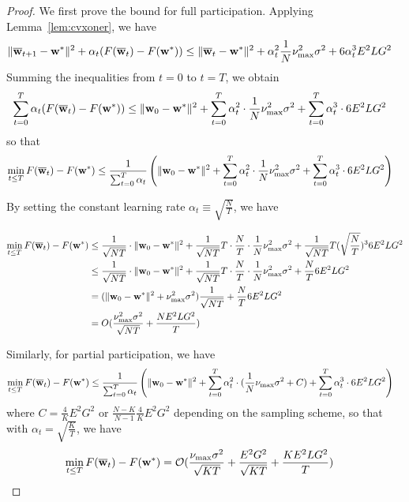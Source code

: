 \begin{proof}
	We first prove the bound for full participation. Applying Lemma~\ref{lem:cvxoner}, we have
	\begin{align*}
	\|{\overline{\mathbf{w}}}_{t+1}-{\mathbf{w}}^{\ast}\|^{2}+\alpha_{t}(F({\overline{\mathbf{w}}}_{t})-F({\mathbf{w}}^{\ast})) & \leq\|{\overline{\mathbf{w}}}_{t}-{\mathbf{w}}^{\ast}\|^{2}+\alpha_{t}^{2}\frac{1}{N}\nu_{\max}^{2}\sigma^{2}+6\alpha_{t}^{3}E^{2}LG^{2}
	\end{align*}
	Summing the inequalities from $t=0$ to $t=T$, we obtain 
	\begin{align*}
	\sum_{t=0}^{T}\alpha_{t}(F({\overline{\mathbf{w}}}_{t})-F({\mathbf{w}}^{\ast})) & \leq\|{\mathbf{w}}_{0}-{\mathbf{w}}^{\ast}\|^{2}+\sum_{t=0}^{T}\alpha_{t}^{2}\cdot\frac{1}{N}\nu_{\max}^{2}\sigma^{2}+\sum_{t=0}^{T}\alpha_{t}^{3}\cdot6E^{2}LG^{2}
	\end{align*}
	so that
	\begin{align*}
	\min_{t\leq T}F({\overline{\mathbf{w}}}_{t})-F({\mathbf{w}}^{\ast}) & \leq\frac{1}{\sum_{t=0}^{T}\alpha_{t}}\left(\|{\mathbf{w}}_{0}-{\mathbf{w}}^{\ast}\|^{2}+\sum_{t=0}^{T}\alpha_{t}^{2}\cdot\frac{1}{N}\nu_{\max}^{2}\sigma^{2}+\sum_{t=0}^{T}\alpha_{t}^{3}\cdot6E^{2}LG^{2}\right)
	\end{align*}
	
	By setting the constant learning rate $\alpha_{t}\equiv\sqrt{\frac{N}{T}}$,
	we have 
	
\begin{align*}
\min_{t\leq T}F({\overline{\mathbf{w}}}_{t})-F({\mathbf{w}}^{\ast}) & \leq\frac{1}{\sqrt{NT}}\cdot\|{\mathbf{w}}_{0}-{\mathbf{w}}^{\ast}\|^{2}+\frac{1}{\sqrt{NT}}T\cdot\frac{N}{T}\cdot\frac{1}{N}\nu_{\max}^{2}\sigma^{2}+\frac{1}{\sqrt{NT}}T(\sqrt{\frac{N}{T}})^{3}6E^{2}LG^{2}\\
& \leq\frac{1}{\sqrt{NT}}\cdot\|{\mathbf{w}}_{0}-{\mathbf{w}}^{\ast}\|^{2}+\frac{1}{\sqrt{NT}}T\cdot\frac{N}{T}\cdot\frac{1}{N}\nu_{\max}^{2}\sigma^{2}+\frac{N}{T}6E^{2}LG^{2}\\
& =(\|{\mathbf{w}}_{0}-{\mathbf{w}}^{\ast}\|^{2}+\nu_{\max}^{2}\sigma^{2})\frac{1}{\sqrt{NT}}+\frac{N}{T}6E^{2}LG^{2}\\
& =O(\frac{\nu_{\max}^{2}\sigma^{2}}{\sqrt{NT}}+\frac{NE^{2}LG^{2}}{T})
\end{align*}
	
	Similarly, for partial participation, we have 
	\begin{align*}
	\min_{t\leq T}F({\overline{\mathbf{w}}}_{t})-F({\mathbf{w}}^{\ast}) & \leq\frac{1}{\sum_{t=0}^{T}\alpha_{t}}\left(\|{\mathbf{w}}_{0}-{\mathbf{w}}^{\ast}\|^{2}+\sum_{t=0}^{T}\alpha_{t}^{2}\cdot(\frac{1}{N}\nu_{\max}\sigma^{2}+C)+\sum_{t=0}^{T}\alpha_{t}^{3}\cdot6E^{2}LG^{2}\right)
	\end{align*}
	where $C=\frac{4}{K}E^{2}G^{2}$ or $\frac{N-K}{N-1}\frac{4}{K}E^{2}G^{2}$ depending on the sampling scheme,
	so that with $\alpha_{t}=\sqrt{\frac{K}{T}}$, we have 
	\begin{align*}
	\min_{t\leq T}F({\overline{\mathbf{w}}}_{t})-F({\mathbf{w}}^{\ast}) & =\mathcal{O}(\frac{\nu_{\max}\sigma^{2}}{\sqrt{KT}}+\frac{E^{2}G^{2}}{\sqrt{KT}}+\frac{KE^{2}LG^{2}}{T})
	\end{align*}
\end{proof}